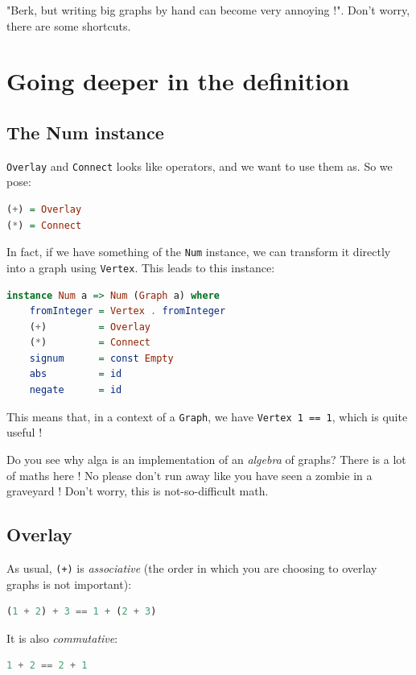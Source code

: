 \documentclass[10pt,a4paper]{article}
\begin{document}
"Berk, but writing big graphs by hand can become very annoying !". Don't worry, there are some shortcuts.

\section{Going deeper in the definition}

\subsection{The Num instance}
\verb|Overlay| and \verb|Connect| looks like operators, and we want to use them as. So we pose:

\begin{lstlisting}[language=Haskell, frame=single]
(+) = Overlay
(*) = Connect
\end{lstlisting}

In fact, if we have something of the \verb|Num| instance, we can transform it directly into a graph using \verb|Vertex|. This leads to this instance:

\begin{lstlisting}[language=Haskell, frame=single]
instance Num a => Num (Graph a) where
	fromInteger = Vertex . fromInteger
	(+)         = Overlay
	(*)         = Connect
	signum      = const Empty
	abs         = id
	negate      = id
\end{lstlisting}

This means that, in a context of a \verb|Graph|, we have \verb|Vertex 1 == 1|, which is quite useful !

Do you see why alga is an implementation of an \emph{algebra} of graphs? There is a lot of maths here ! No please don't run away like you have seen a zombie in a graveyard ! Don't worry, this is not-so-difficult math.

\subsection{Overlay}

As usual, \verb|(+)| is \emph{associative} (the order in which you are choosing to overlay graphs is not important):
\begin{lstlisting}[language=Haskell, frame=single]
(1 + 2) + 3 == 1 + (2 + 3)
\end{lstlisting}

It is also \emph{commutative}:
\begin{lstlisting}[language=Haskell, frame=single]
1 + 2 == 2 + 1
\end{lstlisting}
\end{document}
